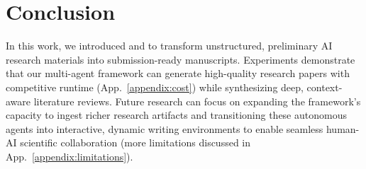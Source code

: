 \section{Conclusion}
\label{sec:conclusion}
In this work, we introduced \ourmethod{} and \ourdataset{} to transform unstructured, preliminary AI research materials into submission-ready manuscripts. Experiments demonstrate that our multi-agent framework can generate high-quality research papers with competitive runtime (App.~\ref{appendix:cost}) while synthesizing deep, context-aware literature reviews. Future research can focus on expanding the framework's capacity to ingest richer research artifacts and transitioning these autonomous agents into interactive, dynamic writing environments to enable seamless human-AI scientific collaboration (more limitations discussed in App.~\ref{appendix:limitations}).